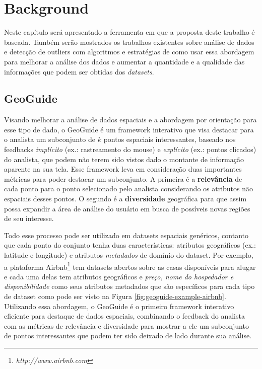 \chapter{Background}
\label{chap:background}

Neste capítulo será apresentado a ferramenta em que a proposta deste trabalho é baseada. Também serão mostrados os trabalhos existentes sobre análise de dados e detecção de outliers com algoritmos e estratégias de como usar essa abordagem para melhorar a análise dos dados e aumentar a quantidade e a qualidade das informações que podem ser obtidas dos \textit{datasets}.

\section{GeoGuide}

Visando melhorar a análise de dados espaciais e a abordagem por orientação para esse tipo de dado, o GeoGuide \cite{omidvarTehrani2017} é um framework interativo que visa destacar para o analista um subconjunto de $k$ pontos espaciais interessantes, baseado nos feedbacks \textit{implícito} (ex.: rastreamento do mouse) e \textit{explícito} (ex.: pontos clicados) do analista, que podem não terem sido vistos dado o montante de informação aparente na sua tela. Esse framework leva em consideração duas importantes métricas para poder destacar um subconjunto. A primeira é a \textbf{relevância} de cada ponto para o ponto selecionado pelo analista considerando os atributos não espaciais desses pontos. O segundo é a \textbf{diversidade} geográfica para que assim possa expandir a área de análise do usuário em busca de possíveis novas regiões de seu interesse.

Todo esse processo pode ser utilizado em datasets espaciais genéricos, contanto que cada ponto do conjunto tenha duas características: atributos geográficos (ex.: latitude e longitude) e atributos \textit{metadados} de domínio do dataset. Por exemplo, a plataforma Airbnb\footnote{\it http://www.airbnb.com} tem datasets abertos sobre as casas disponíveis para alugar e cada uma delas tem atributos geográficos e \textit{preço, nome do hospedador e disponibilidade} como seus atributos metadados que são específicos para cada tipo de dataset como pode ser visto na Figura \ref{fig:geoguide-example-airbnb}. Utilizando essa abordagem, o GeoGuide é o primeiro framework interativo eficiente para destaque de dados espaciais, combinando o feedback do analista com as métricas de relevância e diversidade para mostrar a ele um subconjunto de pontos interessantes que podem ter sido deixado de lado durante sua análise.


